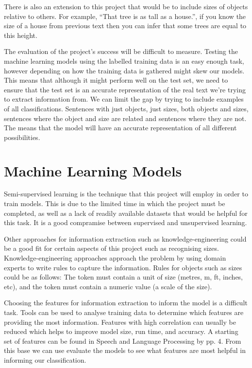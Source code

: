 There is also an extension to this project that would be to include sizes of objects relative to others. For example, “That tree is as tall as a house.”, if you know the size of a house from previous text then you can infer that some trees are equal to this height.

The evaluation of the project’s success will be difficult to measure. Testing the machine learning models using the labelled training data is an easy enough task, however depending on how the training data is gathered might skew our models. This means that although it might perform well on the test set, we need to ensure that the test set is an accurate representation of the real text we’re trying to extract information from. We can limit the gap by trying to include examples of all classifications. Sentences with just objects, just sizes, both objects and sizes, sentences where the object and size are related and sentences where they are not. The means that the model will have an accurate representation of all different possibilities.

\section{Machine Learning Models}

Semi-supervised learning is the technique that this project will employ in order to train models. This is due to the limited time in which the project must be completed, as well as a lack of readily available datasets that would be helpful for this task. It is a good compramise between supervised and unsupervised learning.

Other approaches for information extraction such as knowledge-engineering could be a good fit for certain aspects of this project such as recognising sizes. Knowledge-engineering approaches approach the problem by using domain experts to write rules to capture the information. Rules for objects such as sizes could be as follows: The token must contain a unit of size (metres, m, ft, inches, etc), and the token must contain a numeric value (a scale of the size).

Choosing the features for information extraction to inform the model is a difficult task. Tools can be used to analyse training data to determine which features are providing the most information. Features with high correlation can usually be reduced which helps to improve model size, run time, and accuracy. A starting set of features can be found in Speech and Language Processing by \cite{reference1} pp. 4. From this base we can use evaluate the models to see what features are most helpful in informing our classification.

